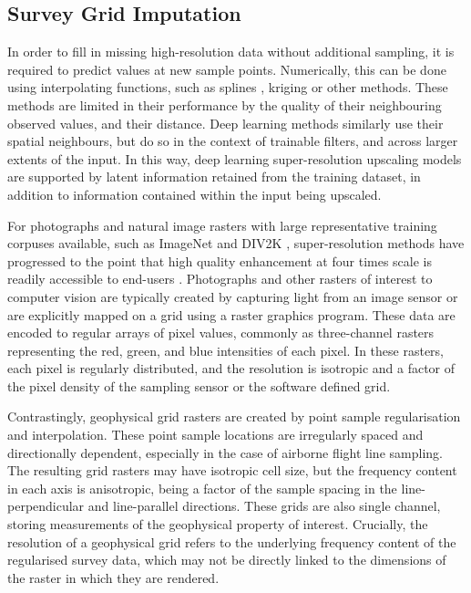 \documentclass[manuscript.tex]{subfiles}
\begin{document}
\subsection{Survey Grid Imputation}
In order to fill in missing high-resolution data without additional sampling, it is required to predict values at new sample points.
Numerically, this can be done using interpolating functions, such as splines \parencite{keysCubicConvolutionInterpolation1981}, kriging \parencite{hansenInterpretiveGriddingAnisotropic1993} or other methods.
These methods are limited in their performance by the quality of their neighbouring observed values, and their distance.
Deep learning methods similarly use their spatial neighbours, but do so in the context of trainable filters, and across larger extents of the input.
In this way, deep learning super-resolution upscaling models are supported by latent information retained from the training dataset, in addition to information contained within the input being upscaled.

For photographs and natural image rasters with large representative training corpuses available, such as ImageNet \parencite{dengImageNetLargescaleHierarchical2009} and DIV2K \parencite{agustssonNTIRE2017Challenge2017}, super-resolution methods have progressed to the point that high quality enhancement at four times scale is readily accessible to end-users \parencite[e.g.][]{wangRealESRGANTrainingRealWorld2021}.
Photographs and other rasters of interest to computer vision are typically created by capturing light from an image sensor or are explicitly mapped on a grid using a raster graphics program.
These data are encoded to regular arrays of pixel values, commonly as three-channel rasters representing the red, green, and blue intensities of each pixel.
In these rasters, each pixel is regularly distributed, and the resolution is isotropic and a factor of the pixel density of the sampling sensor or the software defined grid.

Contrastingly, geophysical grid rasters are created by point sample regularisation and interpolation.
These point sample locations are irregularly spaced and directionally dependent, especially in the case of airborne flight line sampling.
The resulting grid rasters may have isotropic cell size, but the frequency content in each axis is anisotropic, being a factor of the sample spacing in the line-perpendicular and line-parallel directions.
These grids are also single channel, storing measurements of the geophysical property of interest.
Crucially, the resolution of a geophysical grid refers to the underlying frequency content of the regularised survey data, which may not be directly linked to the dimensions of the raster in which they are rendered.
\end{document}

